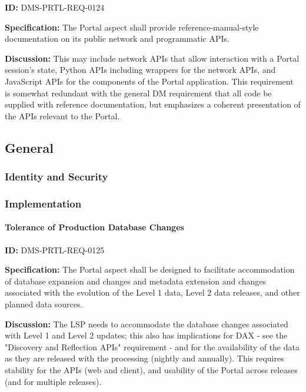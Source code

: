 \documentclass[SE,toc]{lsstdoc}
\begin{document}
\label{DMS-PRTL-REQ-0124}
\textbf{ID:} DMS-PRTL-REQ-0124

\textbf{Specification:}
The Portal aspect shall provide reference-manual-style documentation on its public network and programmatic APIs.

\textbf{Discussion:}
This may include network APIs that allow interaction with a Portal session's state, Python APIs including wrappers for the network APIs, and JavaScript APIs for the components of the Portal application.
This requirement is somewhat redundant with the general DM requirement that all code be supplied with reference documentation, but emphasizes a coherent presentation of the APIs relevant to the Portal.

\subsection{General}

\subsubsection{Identity and Security}

\subsubsection{Implementation}

\paragraph{Tolerance of Production Database Changes}\hfill  %

\label{DMS-PRTL-REQ-0125}
\textbf{ID:} DMS-PRTL-REQ-0125

\textbf{Specification:}
The Portal aspect shall be designed to facilitate accommodation of database expansion and changes and metadata extension and changes associated with the evolution of the Level 1 data, Level 2 data releases, and other planned data sources.

\textbf{Discussion:}
The LSP needs to accommodate the database changes associated with Level 1 and Level 2 updates; this also has implications for DAX - see the "Discovery and Reflection APIs" requirement - and for the availability of the data as they are released with the processing (nightly and annually).  This requires stability for the APIs (web and client), and usability of the Portal across releases (and for multiple releases).
\end{document}
